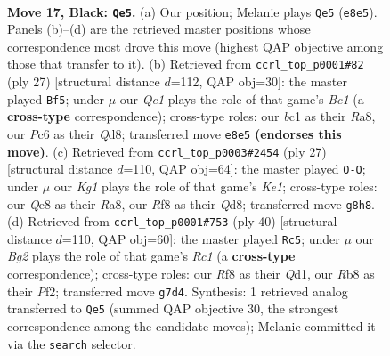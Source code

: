 \documentclass[11pt]{article}
\begin{document}
\clearpage

\begin{figure}[p]\centering
\begin{subfigure}{0.46\textwidth}\centering
\resizebox{\linewidth}{!}{%
\newchessgame
\chessboard[
  setfen={1rb1qrk1/p2n1pb1/2pp4/7p/P1PNp2P/6PB/8/R1BQK2R b KQ - 1 17},
  showmover=false,
  pgfstyle=straightmove, color=movearrow, markmove={e8-e5}
]}
\caption{}
\end{subfigure}\hfill
\begin{subfigure}{0.46\textwidth}\centering
\resizebox{\linewidth}{!}{%
\newchessgame
\chessboard[
  setfen={r1bq1rk1/ppp4p/1n4p1/4b3/4N3/4B2P/PPQ1BPP1/R3K2R b KQ - 1 14},
  showmover=false,
  pgfstyle=straightmove, color=movearrow, markmove={c8-f5}
]}
\caption{}
\end{subfigure}
\\[4pt]
\begin{subfigure}{0.46\textwidth}\centering
\resizebox{\linewidth}{!}{%
\newchessgame
\chessboard[
  setfen={r2qk2r/pp1nbpp1/2p3b1/7p/3N3P/2P3P1/P4PB1/R1BQR1K1 b kq - 1 14},
  showmover=false,
  pgfstyle=straightmove, color=movearrow, markmove={e8-g8}
]}
\caption{}
\end{subfigure}\hfill
\begin{subfigure}{0.46\textwidth}\centering
\resizebox{\linewidth}{!}{%
\newchessgame
\chessboard[
  setfen={1rbq1rk1/5pp1/p4n1p/4p3/P3P3/1B2R2P/3N1PP1/2RQ2K1 w - - 0 21},
  showmover=false,
  pgfstyle=straightmove, color=movearrow, markmove={c1-c5}
]}
\caption{}
\end{subfigure}
\caption{\textbf{Move 17, Black: \texttt{Qe5}.} (a) Our position; Melanie plays \texttt{Qe5} (\texttt{e8e5}). Panels (b)--(d) are the retrieved master positions whose correspondence most drove this move (highest QAP objective among those that transfer to it). (b) Retrieved from \texttt{ccrl\_top\_p0001\#82} (ply 27) [structural distance $d$=112, QAP obj=30]: the master played \texttt{Bf5}; under $\mu$ our \emph{Qe1} plays the role of that game's \emph{Bc1} (a \textbf{cross-type} correspondence); cross-type roles: our \emph{b}c1 as their \emph{R}a8, our \emph{P}c6 as their \emph{Q}d8; transferred move \texttt{e8e5} \textbf{(endorses this move)}. (c) Retrieved from \texttt{ccrl\_top\_p0003\#2454} (ply 27) [structural distance $d$=110, QAP obj=64]: the master played \texttt{O-O}; under $\mu$ our \emph{Kg1} plays the role of that game's \emph{Ke1}; cross-type roles: our \emph{Q}e8 as their \emph{R}a8, our \emph{R}f8 as their \emph{Q}d8; transferred move \texttt{g8h8}. (d) Retrieved from \texttt{ccrl\_top\_p0001\#753} (ply 40) [structural distance $d$=110, QAP obj=60]: the master played \texttt{Rc5}; under $\mu$ our \emph{Bg2} plays the role of that game's \emph{Rc1} (a \textbf{cross-type} correspondence); cross-type roles: our \emph{R}f8 as their \emph{Q}d1, our \emph{R}b8 as their \emph{P}f2; transferred move \texttt{g7d4}. Synthesis: 1 retrieved analog transferred to \texttt{Qe5} (summed QAP objective 30, the strongest correspondence among the candidate moves); Melanie committed it via the \texttt{search} selector.}
\label{fig:thought-m33}
\end{figure}
\end{document}

